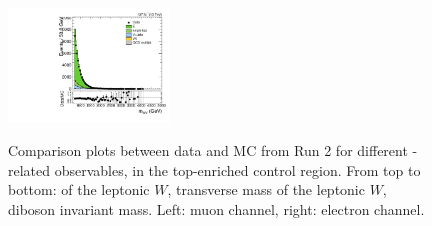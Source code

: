\begin{figure}[htbp]
  \includegraphics[width=0.3825\textwidth]{fig/controlPlots/CR_b1_e_allP_allC_allD_Run2_mWV.pdf}\\
  \caption{
    Comparison plots between data and MC from Run 2 for different \Wlep-related observables, in the top-enriched control region.
    From top to bottom: \pt of the leptonic $W$, transverse mass of the leptonic $W$, diboson invariant mass.
    Left: muon channel, right: electron channel.
  }
  \label{fig:CR_controlPlotsRun2_2}
\end{figure}

